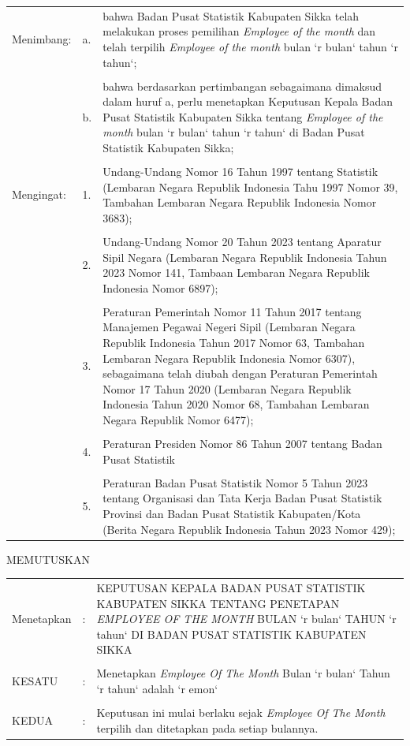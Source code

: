 \documentclass{article}
\begin{document}
\begin{tabular}{llp{11cm}}

	Menimbang: & a. & bahwa Badan Pusat Statistik Kabupaten Sikka telah melakukan proses pemilihan \textit{Employee of the month} dan telah terpilih \textit{Employee of the month} bulan `r bulan` tahun `r tahun`;
	\\
	\\
	& b. & bahwa berdasarkan pertimbangan sebagaimana dimaksud dalam huruf a, perlu menetapkan Keputusan Kepala Badan Pusat Statistik Kabupaten Sikka tentang \textit{Employee of the month} bulan `r bulan` tahun `r tahun` di Badan Pusat Statistik Kabupaten Sikka;
	\bigskip\\
	\\
	Mengingat: & 1. & Undang-Undang Nomor 16 Tahun 1997 tentang Statistik (Lembaran Negara Republik Indonesia Tahu 1997 Nomor 39, Tambahan Lembaran Negara Republik Indonesia Nomor 3683);
	\\
	\\
	& 2. & Undang-Undang Nomor 20 Tahun 2023 tentang Aparatur Sipil Negara (Lembaran Negara Republik Indonesia Tahun 2023 Nomor 141, Tambaan Lembaran Negara Republik Indonesia Nomor 6897);
	\\
	\\
	& 3. & Peraturan Pemerintah Nomor 11 Tahun 2017 tentang Manajemen Pegawai Negeri Sipil (Lembaran Negara Republik Indonesia Tahun 2017 Nomor 63, Tambahan Lembaran Negara Republik Indonesia Nomor 6307), sebagaimana telah diubah dengan Peraturan Pemerintah Nomor 17 Tahun 2020 (Lembaran Negara Republik Indonesia Tahun 2020 Nomor 68, Tambahan Lembaran Negara Republik Nomor 6477);
	\\
	\\
	& 4. & Peraturan Presiden Nomor 86 Tahun 2007 tentang Badan Pusat Statistik
	\\
	\\
	& 5. & Peraturan Badan Pusat Statistik Nomor 5 Tahun 2023 tentang Organisasi dan Tata Kerja Badan Pusat Statistik Provinsi dan Badan Pusat Statistik Kabupaten/Kota (Berita Negara Republik Indonesia Tahun 2023 Nomor 429);
\end{tabular}

\newpage

\begin{center}
MEMUTUSKAN
\end{center}

\begin{tabular}{llp{11cm}}
Menetapkan & : & KEPUTUSAN KEPALA BADAN PUSAT STATISTIK KABUPATEN SIKKA TENTANG PENETAPAN \textit{EMPLOYEE OF THE MONTH} BULAN `r bulan` TAHUN `r tahun` DI BADAN PUSAT STATISTIK KABUPATEN SIKKA
	\\
	\\
KESATU & : &  Menetapkan \textit{Employee Of The Month} Bulan `r bulan` Tahun `r tahun` adalah `r emon`
	\\
	\\
KEDUA & : & Keputusan ini mulai berlaku sejak \textit{Employee Of The Month} terpilih dan ditetapkan pada setiap bulannya.
\end{tabular}
\end{document}
